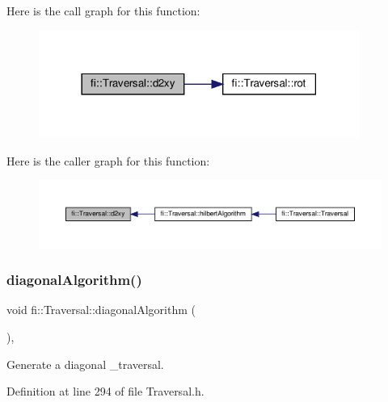 Here is the call graph for this function\+:
\nopagebreak
\begin{figure}[H]
\begin{center}
\leavevmode
\includegraphics[width=297pt]{d8/d0e/classfi_1_1Traversal_a2f0459d7872d143e8b8d750ac14d4d7c_cgraph}
\end{center}
\end{figure}
Here is the caller graph for this function\+:
\nopagebreak
\begin{figure}[H]
\begin{center}
\leavevmode
\includegraphics[width=350pt]{d8/d0e/classfi_1_1Traversal_a2f0459d7872d143e8b8d750ac14d4d7c_icgraph}
\end{center}
\end{figure}
\mbox{\label{classfi_1_1Traversal_af393d529ec262d13ca83dd98f39c2789}} 
\subsubsection{\texorpdfstring{diagonal\+Algorithm()}{diagonalAlgorithm()}}
{\footnotesize\ttfamily void fi\+::\+Traversal\+::diagonal\+Algorithm (\begin{DoxyParamCaption}{ }\end{DoxyParamCaption})\hspace{0.3cm}{\ttfamily [inline]}, {\ttfamily [private]}}



Generate a diagonal \+\_\+traversal. 



Definition at line 294 of file Traversal.\+h.

